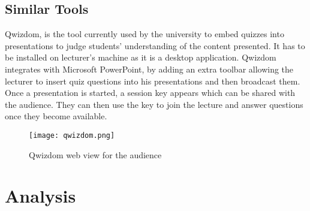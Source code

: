 \subsection{Similar Tools}
Qwizdom\cite{1}, is the tool currently used by the university to embed quizzes into
presentations to judge students' understanding of the content presented. It has to be
installed on lecturer's machine as it is a desktop application. Qwizdom integrates
with Microsoft PowerPoint\cite{17}, by adding an extra toolbar allowing the lecturer
to insert quiz questions into his presentations and then broadcast them. Once
a presentation is started, a session key appears which can be shared with the audience.
They can then use the key to join the lecture and answer questions once they become available.

\begin{figure}[ht]
    \centering
    \texttt{[image: qwizdom.png]}
    \caption{Qwizdom web view for the audience}
    \label{fig:qwizdom}
\end{figure}

\section{Analysis}
%
%
%

